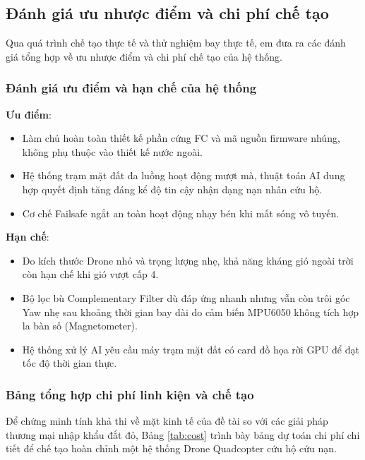 \subsection{Đánh giá ưu nhược điểm và chi phí chế tạo}

Qua quá trình chế tạo thực tế và thử nghiệm bay thực tế, em đưa ra các đánh giá tổng hợp về ưu nhược điểm và chi phí chế tạo của hệ thống.

\subsubsection{Đánh giá ưu điểm và hạn chế của hệ thống}

\textbf{Ưu điểm}:
\begin{itemize}
    \item Làm chủ hoàn toàn thiết kế phần cứng FC và mã nguồn firmware nhúng, không phụ thuộc vào thiết kế nước ngoài.
    \item Hệ thống trạm mặt đất đa luồng hoạt động mượt mà, thuật toán AI dung hợp quyết định tăng đáng kể độ tin cậy nhận dạng nạn nhân cứu hộ.
    \item Cơ chế Failsafe ngắt an toàn hoạt động nhạy bén khi mất sóng vô tuyến.
\end{itemize}

\textbf{Hạn chế}:
\begin{itemize}
    \item Do kích thước Drone nhỏ và trọng lượng nhẹ, khả năng kháng gió ngoài trời còn hạn chế khi gió vượt cấp 4.
    \item Bộ lọc bù Complementary Filter dù đáp ứng nhanh nhưng vẫn còn trôi góc Yaw nhẹ sau khoảng thời gian bay dài do cảm biến MPU6050 không tích hợp la bàn số (Magnetometer).
    \item Hệ thống xử lý AI yêu cầu máy trạm mặt đất có card đồ họa rời GPU để đạt tốc độ thời gian thực.
\end{itemize}

\subsubsection{Bảng tổng hợp chi phí linh kiện và chế tạo}

Để chứng minh tính khả thi về mặt kinh tế của đề tài so với các giải pháp thương mại nhập khẩu đắt đỏ, Bảng \ref{tab:cost} trình bày bảng dự toán chi phí chi tiết để chế tạo hoàn chỉnh một hệ thống Drone Quadcopter cứu hộ cứu nạn.

